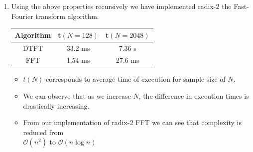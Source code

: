 \documentclass[journal,12pt,twocolumn]{IEEEtran}
\renewcommand\thesection{\arabic{section}}
\begin{document}
\begin{enumerate}[label=\thesection.\arabic*.,ref=\thesection.\theenumi]
\item Using the above properties recursively we have implemented radix-2 the Fast-Fourier transform algorithm.

\begin{center}
 \begin{tabular}{||c c c||} 
 \hline
 Algorithm & t$(N=128)$ & t$(N=2048)$ \\ [0.5ex] 
 \hline\hline
 DTFT & 33.2 ms & 7.36 s \\ 
 \hline
 FFT & 1.54 ms & 27.6 ms \\ [1ex] 
 \hline
\end{tabular}
\end{center}

\begin{itemize}
    \item $t(N)$ corresponds to average time of execution for sample size of $N$.
    \item We can observe that as we increase $N$, the difference in execution times is drastically increasing.
    \item From our implementation of radix-2 FFT we can see that complexity is reduced from 
    \\ $\mathcal{O}(n^2)$ to $\mathcal{O}(n\log{}n)$ 
\end{itemize}


\end{enumerate}
\end{document}
